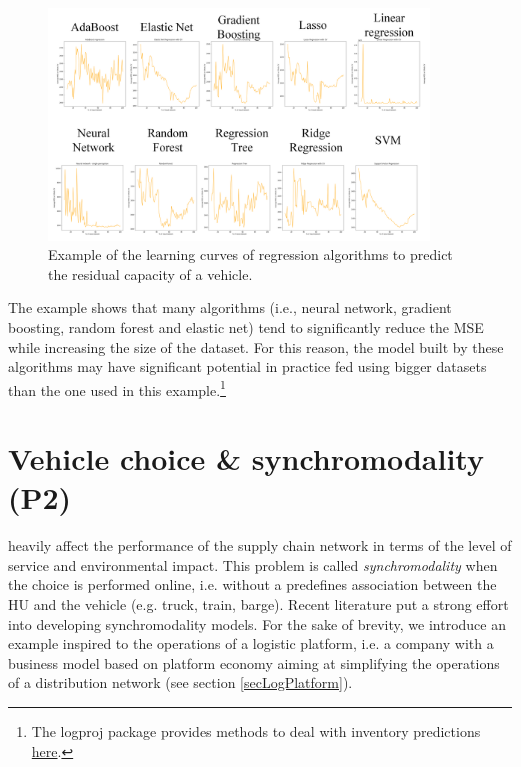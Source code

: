 \begin{figure}[hbt!]
\centering
\includegraphics[width=0.9\textwidth]{SectionDistribution/control_figures/fig_learningCurves.png}
\captionsetup{type=figure}
\caption{Example of the learning curves of regression algorithms to predict the residual capacity of a vehicle.}
\label{fig_learningCurves}
\end{figure}

The example shows that many algorithms (i.e., neural network, gradient boosting, random forest and elastic net) tend to significantly reduce the MSE while increasing the size of the dataset. For this reason, the model built by these algorithms may have significant potential in practice fed using bigger datasets than the one used in this example.\footnote{The logproj package provides methods to deal with inventory predictions \href{https://github.com/aletuf93/logproj/blob/master/examples/LOG_02\%20Demand\%20prediction.ipynb}{here}.}


\section{Vehicle choice \& synchromodality (P2)}

heavily affect the performance of the supply chain network in terms of the level of service and environmental impact. This problem is called \textit{synchromodality} when the choice is performed online, i.e. without a predefines association between the HU and the vehicle (e.g. truck, train, barge). Recent literature put a strong effort into developing synchromodality models. For the sake of brevity, we introduce an example inspired to the operations of a logistic platform, i.e. a company with a business model based on platform economy aiming at simplifying the operations of a distribution network (see section \ref{secLogPlatform}). \par


